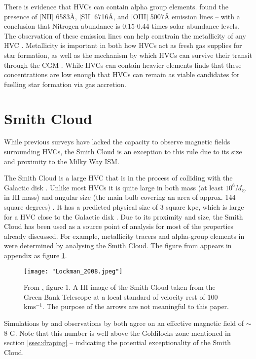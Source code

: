 There is evidence that HVCs can contain alpha group elements. \cite{ID49, ID48} found the presence of [NII] 6583{\AA}, [SII] 6716{\AA}, and [OIII] 5007{\AA} emission lines – with a conclusion that Nitrogen abundance is 0.15-0.44 times solar abundance levels. The observation of these emission lines can help constrain the metallicity of any HVC  \citep{ID49}. Metallicity is important in both how HVCs act as fresh gas supplies for star formation, as well as the mechanism by which HVCs can survive their transit through the CGM \citep{ID24}. While HVCs can contain heavier elements \cite{ID46} finds that these concentrations are low enough that HVCs can remain as viable candidates for fuelling star formation via gas accretion.

\section{Smith Cloud}
\label{sec:sc}

While previous surveys have lacked the capacity to observe magnetic fields surrounding HVCs, the Smith Cloud is an exception to this rule due to its size and proximity to the Milky Way ISM.


The Smith Cloud is a large HVC that is in the process of colliding with the Galactic disk \citep{ID28, ID64, ID35}. Unlike most HVCs it is quite large in both mass (at least $10^6 M_{\odot}$ in HI mass) and angular size (the main bulb covering an area of approx. 144 square degrees) \citep{ID28, ID64, ID35}. It has a predicted physical size of 3 square kpc, which is large for a HVC close to the Galactic disk \citep{ID28}. Due to its proximity and size, the Smith Cloud has been used as a source point of analysis for most of the properties already discussed. For example, metallicity tracers and alpha-group elements in \cite{ID48, ID49} were determined by analysing the Smith Cloud. The figure from \cite{ID28} appears in appendix as figure \ref{fig:sc}.

\begin{figure}
    \texttt{[image: "Lockman\_2008.jpeg"]}
    \centering
    \caption{From \cite{ID28}, figure 1. A HI image of the Smith Cloud taken from the Green Bank Telescope at a local standard of velocity rest of 100 $\mathrm{kms^{-1}}$. The purpose of the arrows are not meaningful to this paper.}
    \label{fig:sc}
\end{figure}


Simulations by \cite{ID23} and observations by \cite{ID26} both agree on an effective magnetic field of $\sim$8 {\textmu}G. Note that this number is well above the Goldilocks zone mentioned in section \ref{ssec:draping} – indicating the potential exceptionality of the Smith Cloud.


